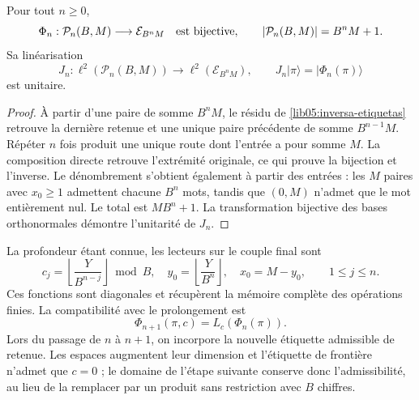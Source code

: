 \begin{theorem}
\label{lib05:teo-rutas}
Pour tout \(n\geq0\),
\begin{equation}
 \Phi_n:\mathcal P_n(B,M)\longrightarrow\mathcal E_{B^nM}
 \quad\hbox{est bijective},\qquad
 |\mathcal P_n(B,M)|=B^nM+1.
 \label{lib05:biyeccion-rutas}
\end{equation}
Sa linéarisation
\begin{equation}
 J_n:\ell^2(\mathcal P_n(B,M))\longrightarrow
          \ell^2(\mathcal E_{B^nM}),\qquad
 J_n|\pi\rangle=|\Phi_n(\pi)\rangle
 \label{lib05:jn}
\end{equation}
est unitaire.
\end{theorem}

\begin{proof}
À partir d’une paire de somme \(B^nM\), le résidu de
\eqref{lib05:inversa-etiquetas} retrouve la dernière retenue et une
unique paire précédente de somme \(B^{n-1}M\). Répéter \(n\) fois
produit une unique route dont l’entrée a pour somme \(M\). La composition
directe retrouve l’extrémité originale, ce qui prouve la bijection et
l’inverse. Le dénombrement s’obtient également à partir des entrées : les
\(M\) paires avec \(x_0\geq1\) admettent chacune \(B^n\) mots,
tandis que \((0,M)\) n’admet que le mot entièrement
nul. Le total est \(MB^n+1\). La transformation bijective des
bases orthonormales démontre l’unitarité de \(J_n\).
\end{proof}

La profondeur étant connue, les lecteurs sur le couple final sont
\begin{equation}
 c_j=\left\lfloor\frac{Y}{B^{n-j}}\right\rfloor\bmod B,
 \quad y_0=\left\lfloor\frac{Y}{B^n}\right\rfloor,
 \quad x_0=M-y_0,
 \qquad 1\leq j\leq n.
 \label{lib05:lectores-ruta}
\end{equation}
Ces fonctions sont diagonales et récupèrent la mémoire complète des
opérations finies. La compatibilité avec le prolongement est
\begin{equation}
 \Phi_{n+1}(\pi,c)=L_c(\Phi_n(\pi)).
 \label{lib05:compatibilidad-prolongacion}
\end{equation}
Lors du passage de \(n\) à \(n+1\), on incorpore la nouvelle étiquette
admissible de retenue. Les espaces augmentent leur dimension et
l’étiquette de frontière n’admet que \(c=0\) ; le domaine de
l’étape suivante conserve donc l’admissibilité, au lieu de la remplacer
par un produit sans restriction avec \(B\) chiffres.

